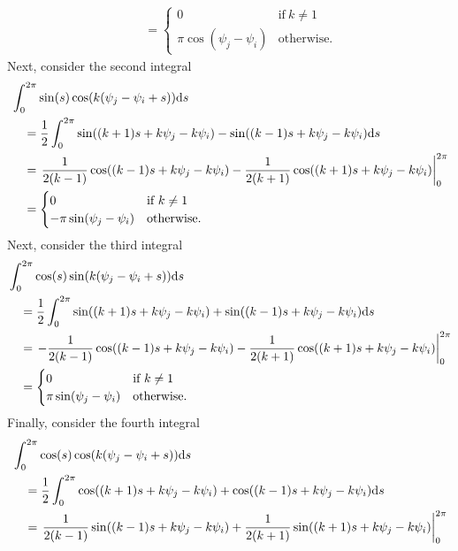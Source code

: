 \documentclass[12pt]{report}
\begin{document}
\begin{solution}
\begin{enumerate}
\begin{align*}
            &\quad = \begin{cases}
                0 & \text{if}~k\neq1\\
                \pi \cos(\psi_j - \psi_i) &\text{otherwise.}
            \end{cases}
        \end{align*}
        Next, consider the second integral
        \begin{align*}
            &\int_0^{2\pi} \sin(s)\cos(k(\psi_j - \psi_i + s)){\mathrm{d}} s\\
            &\quad = \frac{1}{2}\int_0^{2\pi} \sin((k+1)s + k \psi_j - k\psi_i) - \sin((k-1)s + k \psi_j - k\psi_i){\mathrm{d}} s\\
            &\quad = \left. \frac{1}{2(k-1)}\cos((k-1)s + k\psi_j - k\psi_i) - \frac{1}{2(k+1)}\cos((k+1)s + k\psi_j - k\psi_i) \right|_0^{2\pi}\\
            &\quad = \begin{cases}
                0 & \text{if}~k\neq1\\
                -\pi \sin(\psi_j - \psi_i) &\text{otherwise.}
            \end{cases}
        \end{align*}
        Next, consider the third integral
        \begin{align*}
            &\int_0^{2\pi} \cos(s)\sin(k(\psi_j - \psi_i + s)){\mathrm{d}} s\\
            &\quad = \frac{1}{2}\int_0^{2\pi} \sin((k+1)s + k \psi_j - k\psi_i) + \sin((k-1)s + k \psi_j - k\psi_i){\mathrm{d}} s\\
            &\quad = \left. -\frac{1}{2(k-1)}\cos((k-1)s + k\psi_j - k\psi_i) - \frac{1}{2(k+1)}\cos((k+1)s + k\psi_j - k\psi_i) \right|_0^{2\pi}\\
            &\quad = \begin{cases}
                0 & \text{if}~k\neq1\\
                \pi \sin(\psi_j - \psi_i) &\text{otherwise.}
            \end{cases}
        \end{align*}
        Finally, consider the fourth integral
        \begin{align*}
            &\int_0^{2\pi} \cos(s)\cos(k(\psi_j - \psi_i + s))\d s\\
            &\quad = \frac{1}{2}\int_0^{2\pi} \cos((k+1)s + k \psi_j - k\psi_i) + \cos((k-1)s + k \psi_j - k\psi_i)\d s\\
            &\quad = \left. \frac{1}{2(k-1)}\sin((k-1)s + k\psi_j - k\psi_i) + \frac{1}{2(k+1)}\sin((k+1)s + k\psi_j - k\psi_i) \right|_0^{2\pi}\\

\end{align*}
\end{enumerate}
\end{solution}
\end{document}
